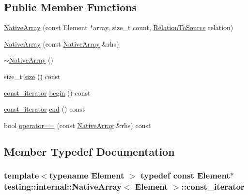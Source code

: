 \subsection*{Public Member Functions}
\begin{DoxyCompactItemize}
\item 
\hyperlink{classtesting_1_1internal_1_1_native_array_a568de999aca0fc0c2cc574fac2405872}{Native\+Array} (const Element $\ast$array, size\+\_\+t count, \hyperlink{namespacetesting_1_1internal_aec4f0eeb60b6b8af8dcf979578bbf3bb}{Relation\+To\+Source} relation)
\item 
\hyperlink{classtesting_1_1internal_1_1_native_array_abb346ac3040f5da733f594cc2d5958bc}{Native\+Array} (const \hyperlink{classtesting_1_1internal_1_1_native_array}{Native\+Array} \&rhs)
\item 
\hyperlink{classtesting_1_1internal_1_1_native_array_a55ab5948d473a487303dcf6e02ad1f60}{$\sim$\+Native\+Array} ()
\item 
size\+\_\+t \hyperlink{classtesting_1_1internal_1_1_native_array_a45de2485baac8bf148e2943828094a40}{size} () const 
\item 
\hyperlink{classtesting_1_1internal_1_1_native_array_a9ce7c8408460d7158a2870456d134557}{const\+\_\+iterator} \hyperlink{classtesting_1_1internal_1_1_native_array_a49c534d29034d9230372ada54ef961bb}{begin} () const 
\item 
\hyperlink{classtesting_1_1internal_1_1_native_array_a9ce7c8408460d7158a2870456d134557}{const\+\_\+iterator} \hyperlink{classtesting_1_1internal_1_1_native_array_a4957ad1ebf7c21eab07d5e0ae2bb17aa}{end} () const 
\item 
bool \hyperlink{classtesting_1_1internal_1_1_native_array_a60af8d9c429771ee131b5ddf7e06e3c9}{operator==} (const \hyperlink{classtesting_1_1internal_1_1_native_array}{Native\+Array} \&rhs) const 
\end{DoxyCompactItemize}


\subsection{Member Typedef Documentation}
\hypertarget{classtesting_1_1internal_1_1_native_array_a9ce7c8408460d7158a2870456d134557}{}
\subsubsection[{const\+\_\+iterator}]{\setlength{\rightskip}{0pt plus 5cm}template$<$typename Element $>$ typedef const Element$\ast$ {\bf testing\+::internal\+::\+Native\+Array}$<$ Element $>$\+::{\bf const\+\_\+iterator}}\label{classtesting_1_1internal_1_1_native_array_a9ce7c8408460d7158a2870456d134557}
\hypertarget{classtesting_1_1internal_1_1_native_array_ac1301a57977b57a1ad013e4e25fc2a72}{}
